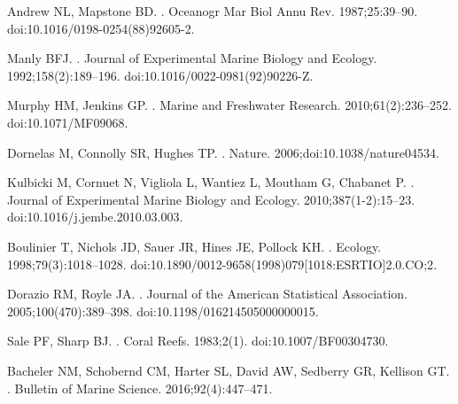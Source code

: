 \documentclass[10pt,letterpaper]{article}
\begin{document}
\begin{thebibliography}{10}
Andrew NL, Mapstone BD.
.
\newblock Oceanogr Mar Biol Annu Rev. 1987;25:39--90.
\newblock doi:{10.1016/0198-0254(88)92605-2}.

Manly BFJ.
.
\newblock Journal of Experimental Marine Biology and Ecology.
  1992;158(2):189--196.
\newblock doi:{10.1016/0022-0981(92)90226-Z}.

Murphy HM, Jenkins GP.
.
\newblock Marine and Freshwater Research. 2010;61(2):236--252.
\newblock doi:{10.1071/MF09068}.

Dornelas M, Connolly SR, Hughes TP.
.
\newblock Nature. 2006;doi:{10.1038/nature04534}.

Kulbicki M, Cornuet N, Vigliola L, Wantiez L, Moutham G, Chabanet P.
.
\newblock Journal of Experimental Marine Biology and Ecology.
  2010;387(1-2):15--23.
\newblock doi:{10.1016/j.jembe.2010.03.003}.

Boulinier T, Nichols JD, Sauer JR, Hines JE, Pollock KH.
.
\newblock Ecology. 1998;79(3):1018--1028.
\newblock doi:{10.1890/0012-9658(1998)079[1018:ESRTIO]2.0.CO;2}.

Dorazio RM, Royle JA.
.
\newblock Journal of the American Statistical Association.
  2005;100(470):389--398.
\newblock doi:{10.1198/016214505000000015}.

Sale PF, Sharp BJ.
.
\newblock Coral Reefs. 1983;2(1).
\newblock doi:{10.1007/BF00304730}.

Bacheler NM, Schobernd CM, Harter SL, David AW, Sedberry GR, Kellison GT.
.
\newblock Bulletin of Marine Science. 2016;92(4):447--471.


\end{thebibliography}
\end{document}
